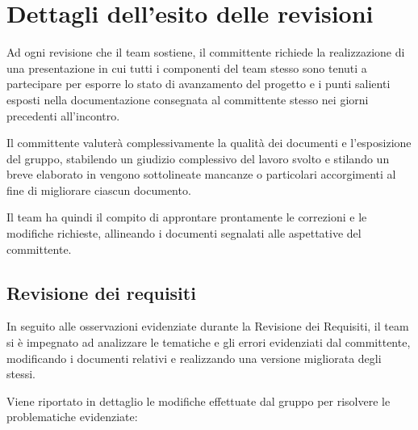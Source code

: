 \section{Dettagli dell'esito delle revisioni}
Ad ogni revisione che il team sostiene, il committente richiede la realizzazione di una presentazione in cui tutti i componenti del team stesso sono tenuti a partecipare per esporre lo stato di avanzamento del progetto e i punti salienti esposti nella documentazione consegnata al committente stesso nei giorni precedenti all'incontro.

Il committente valuterà complessivamente la qualità dei documenti e l'esposizione del gruppo, stabilendo un giudizio complessivo del lavoro svolto e stilando un breve elaborato in vengono sottolineate mancanze o particolari accorgimenti al fine di migliorare ciascun documento.

Il team ha quindi il compito di approntare prontamente le correzioni e le modifiche richieste, allineando i documenti segnalati alle aspettative del committente.

\subsection{Revisione dei requisiti}
In seguito alle osservazioni evidenziate durante la Revisione dei Requisiti, il team si è impegnato ad analizzare le tematiche e gli errori evidenziati dal committente, modificando i documenti relativi e realizzando una versione migliorata degli stessi.

Viene riportato in dettaglio le modifiche effettuate dal gruppo per risolvere le problematiche evidenziate:

